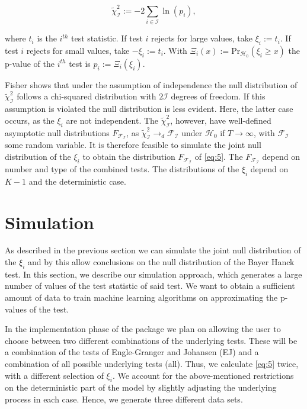 \documentclass[12pt,a4paper]{article}
\begin{document}
\begin{equation}
\tilde{\chi}^2_{\mathcal{I}} := -2 \sum_{i \in \mathcal{I}} \ln{(p_i)},
\label{eq:5}
\end{equation}

where \(t_i\) is the \(i^{th}\) test statistic. If test \(i\) rejects
for large values, take \(\xi_i := t_i\). If test \(i\) rejects for small
values, take \(-\xi_i := t_i\). With
\(\Xi_i(x) := \text{Pr}_{\mathcal{H_0}}(\xi_i \geq x)\) the p-value of
the \(i^{th}\) test is \(p_i := \Xi_i(\xi_i)\).

Fisher shows that under the assumption of independence the null
distribution of \(\tilde{\chi}^2_{\mathcal{I}}\) follows a chi-squared
distribution with \(2\mathcal{I}\) degrees of freedom. If this
assumption is violated the null distribution is less evident. Here, the
latter case occurs, as the \(\xi_i\) are not independent. The
\(\tilde{\chi}^2_{\mathcal{I}}\), however, have well-defined asymptotic
null distributions \(F_{\mathcal{F_I}}\), as
\(\tilde{\chi}^2_{\mathcal{I}} \rightarrow_d \mathcal{F_I}\) under
\(\mathcal{H}_0\) if \(T \rightarrow \infty\), with \(\mathcal{F_I}\)
some random variable. It is therefore feasible to simulate the joint
null distribution of the \(\xi_i\) to obtain the distribution
\(F_{\mathcal{F_I}}\) of \eqref{eq:5}. The \(F_{\mathcal{F_I}}\) depend
on number and type of the combined tests. The distributions of the
\(\xi_i\) depend on \(K-1\) and the deterministic case.

\hypertarget{simulation}{%
\section{Simulation}\label{simulation}}

As described in the previous section we can simulate the joint null
distribution of the \(\xi_i\) and by this allow conclusions on the null
distribution of the Bayer Hanck test. In this section, we describe our
simulation approach, which generates a large number of values of the
test statistic of said test. We want to obtain a sufficient amount of
data to train machine learning algorithms on approximating the p-values
of the test.

In the implementation phase of the package we plan on allowing the user
to choose between two different combinations of the underlying tests.
These will be a combination of the tests of Engle-Granger and Johansen
(EJ) and a combination of all possible underlying tests (all). Thus, we
calculate \eqref{eq:5} twice, with a different selection of \(\xi_i\).
We account for the above-mentioned restrictions on the deterministic
part of the model by slightly adjusting the underlying process in each
case. Hence, we generate three different data sets.
\end{document}
